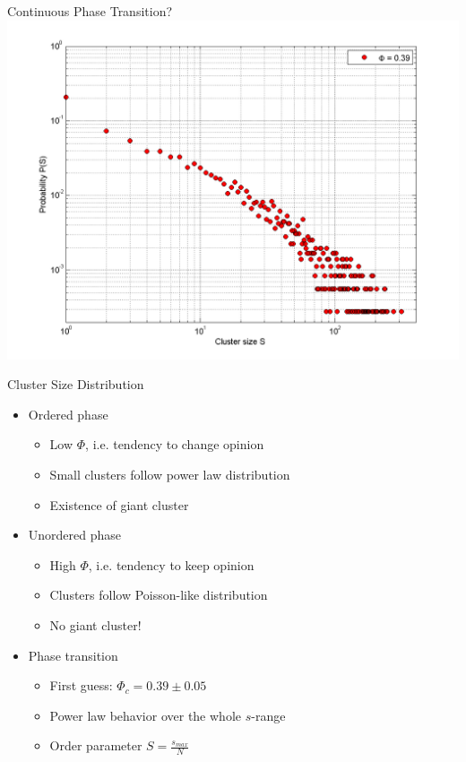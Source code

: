 \documentclass[xcolor=x11names,compress]{beamer}
\renewcommand{\(}{\begin{columns}}
\renewcommand{\)}{\end{columns}}
\newcommand{\<}[1]{\begin{column}{#1}}
\renewcommand{\>}{\end{column}}
\begin{document}

\begin{frame}{Continuous Phase Transition?}
\includegraphics[scale=0.5]{Graphics/ClustersizeDistr/31.png}
\end{frame}


\begin{frame}{Cluster Size Distribution}
\begin{itemize}
\item Ordered phase
\begin{itemize}
\item Low $\Phi$, i.e. tendency to change opinion
\item Small clusters follow power law distribution
\item Existence of giant cluster
\end{itemize}
\item Unordered phase
\begin{itemize}
\item High $\Phi$, i.e. tendency to keep opinion
\item Clusters follow Poisson-like distribution
\item No giant cluster!
\end{itemize}
\item Phase transition
\begin{itemize}
\item First guess: $\Phi_c = 0.39 \pm 0.05$
\item Power law behavior over the whole $s$-range
\item Order parameter $S=\frac{s_{max}}{N}$
\end{itemize}
\end{itemize}
\end{frame}
\end{document}
